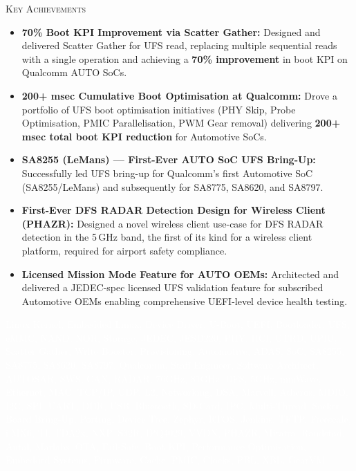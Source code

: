 \documentclass[10pt, a4paper]{article}
\newcommand{\MainHeading}[1]{%
    {\noindent \color{ltgrey}\normalsize{\textsc {#1}}}\vspace{2pt}}%
\begin{document}
\MainHeading{\color{accentblue}Key Achievements}\vspace{-1.5em}\newline %
\begin{itemize}
  \item \textbf{70\% Boot KPI Improvement via Scatter Gather:}
        Designed and delivered Scatter Gather for UFS read, replacing multiple
        sequential reads with a single operation and achieving a
        \textbf{70\% improvement} in boot KPI on Qualcomm AUTO SoCs.

  \item \textbf{200+ msec Cumulative Boot Optimisation at Qualcomm:}
        Drove a portfolio of UFS boot optimisation initiatives (PHY Skip, Probe
        Optimisation, PMIC Parallelisation, PWM Gear removal) delivering
        \textbf{200+ msec total boot KPI reduction} for Automotive SoCs.

  \item \textbf{SA8255 (LeMans) --- First-Ever AUTO SoC UFS Bring-Up:}
        Successfully led UFS bring-up for Qualcomm's first Automotive SoC
        (SA8255/LeMans) and subsequently for SA8775, SA8620, and SA8797.

  \item \textbf{First-Ever DFS RADAR Detection Design for Wireless Client (PHAZR):}
        Designed a novel wireless client use-case for DFS RADAR detection
        in the 5\,GHz band, the first of its kind for a wireless client platform,
        required for airport safety compliance.

  \item \textbf{Licensed Mission Mode Feature for AUTO OEMs:}
        Architected and delivered a JEDEC-spec licensed UFS validation feature
        for subscribed Automotive OEMs enabling comprehensive UEFI-level
        device health testing.
\end{itemize}

\begin{center}
\textcolor{white}{\tiny
Linux Kernel, Embedded Linux, Device Driver, U-Boot, UEFI, Bootloader,
UFS, eMMC, NAND, NOR, Storage, JEDEC, JESD220, PHY, HCI, UTRD, UPIU,
Scatter Gather, Write Booster, Provisioning, Automotive, ADAS, SoC,
SA8255, SA8775, SA8620, SA8797, Qualcomm, Staff Engineer, Software Architect,
AUTOSAR, SWS, CAN, RADAR, 76GHz, 81GHz, DFS, 5GHz, mmWave,
Ethernet, MAC, TCP/IP, UDP, L2, Networking, DSA, Marvell, Atheros, MDIO,
I2C, SPI, UART, DDR, USB, Bluetooth, SD-Card, IPC, Multi-Thread, Socket,
Board Bring-Up, Porting, Device Tree, Zephyr, RTOS, Jenkins, TFTP,
Freescale, i.MX6, TI, TDA2x, NXP, S32R, IPQ4029, VVDN, PHAZR, Mirafra,
Randstad, Antal, Marlabs, OTA, Fail-Safe, Boot KPI, Performance Optimisation,
Embedded Systems, Firmware, Cache, PMIC, Clocks, PBL, XBL, GearVM
}
\end{center}
\end{document}
